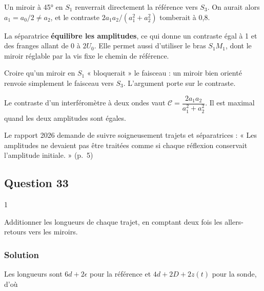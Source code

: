 \documentclass[11pt,a4paper]{article}
\begin{document}
Un miroir à 45° en \(S_1\) renverrait directement la référence vers \(S_3\). On aurait alors \(a_1=a_0/2\neq a_2\), et le contraste \(2a_1a_2/(a_1^2+a_2^2)\) tomberait à 0,8.

La séparatrice \textbf{équilibre les amplitudes}, ce qui donne un contraste égal à 1 et des franges allant de \(0\) à \(2U_0\). Elle permet aussi d'utiliser le bras \(S_1M_1\), dont le miroir réglable par la vis fixe le chemin de référence.

\begin{piege}

Croire qu'un miroir en \(S_1\) « bloquerait » le faisceau : un miroir bien orienté renvoie simplement le faisceau vers \(S_3\). L'argument porte sur le contraste.

\end{piege}

\begin{methode}

Le contraste d'un interféromètre à deux ondes vaut \(\mathcal C=\dfrac{2a_1a_2}{a_1^2+a_2^2}\). Il est maximal quand les deux amplitudes sont égales.

\end{methode}

\begin{jury}

Le rapport 2026 demande de suivre soigneusement trajets et séparatrices : « Les amplitudes ne devaient pas être traitées comme si chaque réflexion conservait l'amplitude initiale. » (p.~5)

\end{jury}

\hypertarget{question-33}{%
\subsection{Question 33}\label{question-33}}

\begin{indication}{1}

Additionner les longueurs de chaque trajet, en comptant deux fois les allers-retours vers les miroirs.

\end{indication}

\hypertarget{solution-32}{%
\subsubsection{Solution}\label{solution-32}}

Les longueurs sont \(6d+2\epsilon\) pour la référence et \(4d+2D+2z(t)\) pour la sonde, d'où
\end{document}
